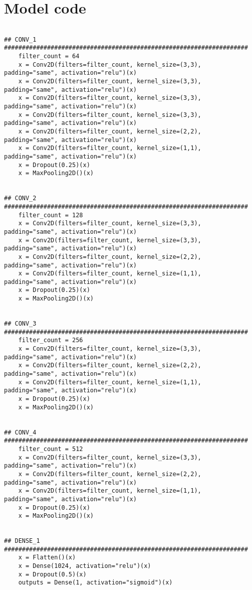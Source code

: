 \appendix
\section{Model code}\label{sec:model}
\begin{verbatim}

## CONV_1 ####################################################################
    filter_count = 64
    x = Conv2D(filters=filter_count, kernel_size=(3,3), padding="same", activation="relu")(x)
    x = Conv2D(filters=filter_count, kernel_size=(3,3), padding="same", activation="relu")(x)
    x = Conv2D(filters=filter_count, kernel_size=(3,3), padding="same", activation="relu")(x)
    x = Conv2D(filters=filter_count, kernel_size=(3,3), padding="same", activation="relu")(x)
    x = Conv2D(filters=filter_count, kernel_size=(2,2), padding="same", activation="relu")(x)
    x = Conv2D(filters=filter_count, kernel_size=(1,1), padding="same", activation="relu")(x)
    x = Dropout(0.25)(x)
    x = MaxPooling2D()(x)


## CONV_2 ####################################################################
    filter_count = 128
    x = Conv2D(filters=filter_count, kernel_size=(3,3), padding="same", activation="relu")(x)
    x = Conv2D(filters=filter_count, kernel_size=(3,3), padding="same", activation="relu")(x)
    x = Conv2D(filters=filter_count, kernel_size=(2,2), padding="same", activation="relu")(x)
    x = Conv2D(filters=filter_count, kernel_size=(1,1), padding="same", activation="relu")(x)
    x = Dropout(0.25)(x)
    x = MaxPooling2D()(x)


## CONV_3 ####################################################################
    filter_count = 256
    x = Conv2D(filters=filter_count, kernel_size=(3,3), padding="same", activation="relu")(x)
    x = Conv2D(filters=filter_count, kernel_size=(2,2), padding="same", activation="relu")(x)
    x = Conv2D(filters=filter_count, kernel_size=(1,1), padding="same", activation="relu")(x)
    x = Dropout(0.25)(x)
    x = MaxPooling2D()(x)


## CONV_4 ####################################################################
    filter_count = 512
    x = Conv2D(filters=filter_count, kernel_size=(3,3), padding="same", activation="relu")(x)
    x = Conv2D(filters=filter_count, kernel_size=(2,2), padding="same", activation="relu")(x)
    x = Conv2D(filters=filter_count, kernel_size=(1,1), padding="same", activation="relu")(x)
    x = Dropout(0.25)(x)
    x = MaxPooling2D()(x)


## DENSE_1 ####################################################################
    x = Flatten()(x)
    x = Dense(1024, activation="relu")(x)
    x = Dropout(0.5)(x)
    outputs = Dense(1, activation="sigmoid")(x)

\end{verbatim}
